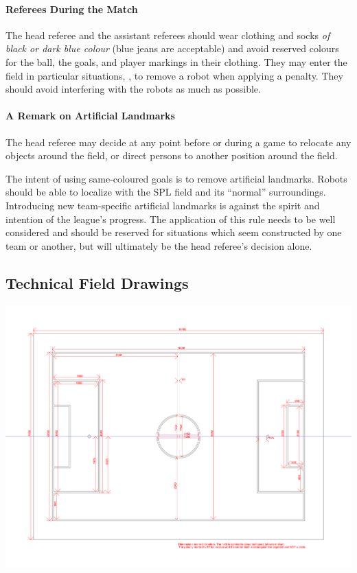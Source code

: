 \paragraph{Referees During the Match}

The head referee and the assistant referees should wear clothing and socks \emph{of black or dark blue colour} (blue jeans are acceptable) and avoid reserved colours for the ball, the goals, and player markings in their clothing. They may enter the field in particular situations, \eg, to remove a robot when applying a penalty. They should avoid interfering with the robots as much as possible.

\paragraph{A Remark on Artificial Landmarks}
\label{sec:judgment:landmarks}

The head referee may decide at any point before or during a game to relocate any objects around the field, or direct persons to another position around the field.

The intent of using same-coloured goals is to remove artificial landmarks.
Robots should be able to localize with the SPL field and its ``normal'' surroundings.
Introducing new team-specific artificial landmarks is against the spirit and intention of the league's progress.
The application of this rule needs to be well considered and should be reserved for situations which seem constructed by one team or another, but will ultimately be the head referee's decision alone.

\subsection{Technical Field Drawings}
\label{apx:technical-drawing}
\centerline{\includegraphics[angle=90,origin=c,width=\columnwidth]{figs/fieldDimensions2020_technical.pdf}}

